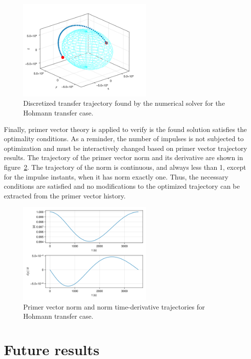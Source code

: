 \begin{figure}[htbp]
    \centering
    \includegraphics[width=0.6\textwidth]{img/hohmann_solved.png}
    \caption{Discretized transfer trajectory found by the numerical solver for the Hohmann transfer case.}
    \label{fig:hohmann_traj}
\end{figure}

Finally, primer vector theory is applied to verify is the found solution satisfies the optimality conditions. As a reminder, the number of impulses is not subjected to optimization and must be interactively changed based on primer vector trajectory results. The trajectory of the primer vector norm and its derivative are shown in figure~\ref{fig:hohmann_primer_vec}. The trajectory of the norm is continuous, and always less than 1, except for the impulse instants, when it has norm exactly one. Thus, the necessary conditions are satisfied and no modifications to the optimized trajectory can be extracted from the primer vector history.

\begin{figure}[htbp]
    \centering
    \includegraphics[width=0.6\textwidth]{img/hohmann_primer_vector_history.png}
    \caption{Primer vector norm and norm time-derivative trajectories for Hohmann transfer case.}
    \label{fig:hohmann_primer_vec}
\end{figure}

\section{Future results}